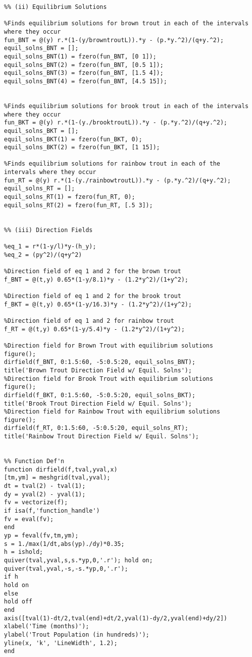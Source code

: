 \documentclass[letterpaper,12pt]{article}
\begin{document}
\begin{appendices}
\begin{spacing}{1}
\begin{lstlisting}
%% (ii) Equilibrium Solutions

%Finds equilibrium solutions for brown trout in each of the intervals where they occur
fun_BNT = @(y) r.*(1-(y/browntroutL)).*y - (p.*y.^2)/(q+y.^2);
equil_solns_BNT = [];
equil_solns_BNT(1) = fzero(fun_BNT, [0 1]);
equil_solns_BNT(2) = fzero(fun_BNT, [0.5 1]);
equil_solns_BNT(3) = fzero(fun_BNT, [1.5 4]);
equil_solns_BNT(4) = fzero(fun_BNT, [4.5 15]);


%Finds equilibrium solutions for brook trout in each of the intervals where they occur
fun_BKT = @(y) r.*(1-(y./brooktroutL)).*y - (p.*y.^2)/(q+y.^2);
equil_solns_BKT = [];
equil_solns_BKT(1) = fzero(fun_BKT, 0);
equil_solns_BKT(2) = fzero(fun_BKT, [1 15]);

%Finds equilibrium solutions for rainbow trout in each of the intervals where they occur
fun_RT = @(y) r.*(1-(y./rainbowtroutL)).*y - (p.*y.^2)/(q+y.^2);
equil_solns_RT = [];
equil_solns_RT(1) = fzero(fun_RT, 0);
equil_solns_RT(2) = fzero(fun_RT, [.5 3]);


%% (iii) Direction Fields

%eq_1 = r*(1-y/l)*y-(h_y);
%eq_2 = (py^2)/(q+y^2)

%Direction field of eq 1 and 2 for the brown trout
f_BNT = @(t,y) 0.65*(1-y/8.1)*y - (1.2*y^2)/(1+y^2);

%Direction field of eq 1 and 2 for the brook trout
f_BKT = @(t,y) 0.65*(1-y/16.3)*y - (1.2*y^2)/(1+y^2);

%Direction field of eq 1 and 2 for rainbow trout
f_RT = @(t,y) 0.65*(1-y/5.4)*y - (1.2*y^2)/(1+y^2);

%Direction field for Brown Trout with equilibrium solutions
figure();
dirfield(f_BNT, 0:1.5:60, -5:0.5:20, equil_solns_BNT);
title('Brown Trout Direction Field w/ Equil. Solns');
%Direction field for Brook Trout with equilibrium solutions
figure();
dirfield(f_BKT, 0:1.5:60, -5:0.5:20, equil_solns_BKT);
title('Brook Trout Direction Field w/ Equil. Solns');
%Direction field for Rainbow Trout with equilibrium solutions
figure();
dirfield(f_RT, 0:1.5:60, -5:0.5:20, equil_solns_RT);
title('Rainbow Trout Direction Field w/ Equil. Solns');


%% Function Def'n
function dirfield(f,tval,yval,x)
[tm,ym] = meshgrid(tval,yval);
dt = tval(2) - tval(1);
dy = yval(2) - yval(1);
fv = vectorize(f);
if isa(f,'function_handle')
fv = eval(fv);
end
yp = feval(fv,tm,ym);
s = 1./max(1/dt,abs(yp)./dy)*0.35;
h = ishold;
quiver(tval,yval,s,s.*yp,0,'.r'); hold on;
quiver(tval,yval,-s,-s.*yp,0,'.r');
if h
hold on
else
hold off
end
axis([tval(1)-dt/2,tval(end)+dt/2,yval(1)-dy/2,yval(end)+dy/2])
xlabel('Time (months)');
ylabel('Trout Population (in hundreds)');
yline(x, 'k', 'LineWidth', 1.2);
end
\end{lstlisting}
\end{spacing}
\newpage

\end{appendices}
\end{document}
